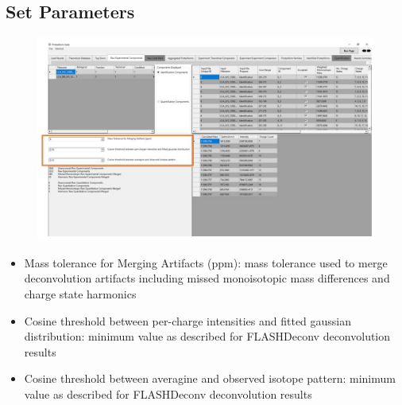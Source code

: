 \subsection{Set Parameters}
\begin{figure}[h]
\centering
\includegraphics[scale=0.5]{figures/rawcomponents1.jpg}
\end{figure}
\begin{itemize}
\item Mass tolerance for Merging Artifacts (ppm): mass tolerance used to merge deconvolution artifacts including missed monoisotopic mass differences and charge state harmonics
\item Cosine threshold between per-charge intensities and fitted gaussian distribution: minimum value as described for FLASHDeconv deconvolution results
\item Cosine threshold between averagine and observed isotope pattern: minimum value as described for FLASHDeconv deconvolution results
\end{itemize}
